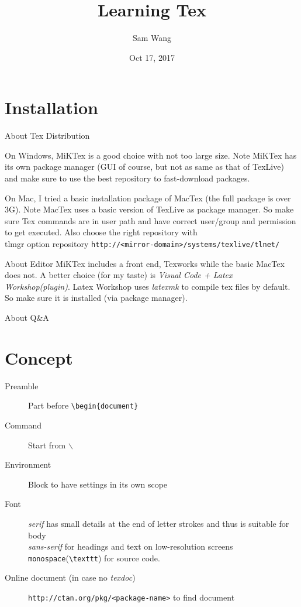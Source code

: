 \documentclass{article}
\title{Learning Tex}
\author{Sam Wang}
\date{Oct 17, 2017}
\newcommand{\site}[2][protocol]{\texttt{#1://#2}}
\begin{document}
\maketitle

\tableofcontents

\section{Installation}
About Tex Distribution

On Windows, MiKTex is a good choice with not too large size. Note MiKTex has its own package manager (GUI of course, but not as same as that of TexLive) and make sure to use the best repository to fast-download packages. 

On Mac, I tried a basic installation package of MacTex (the full package is over 3G). Note MacTex uses a basic version of TexLive as package manager. So make sure Tex commands are in user path and have correct user/group and permission to get executed. Also choose the right repository with 
\\tlmgr option repository \site[http]{<mirror-domain>/systems/texlive/tlnet/} 

About Editor
MiKTex includes a front end, Texworks\label{texworks} while the basic MacTex does not. A better choice (for my taste) is \emph{Visual Code + Latex Workshop(plugin)}. Latex Workshop uses \emph{latexmk} to compile tex files by default. So make sure it is installed (via package manager). 

About Q\&A \cite{R02}

\section{Concept}
\begin{description}
\item[Preamble]Part before \verb|\begin{document}|
\item[Command]Start from $\backslash$
\item[Environment]Block to have settings in its own scope
\item[Font]\emph{serif} has small details at the end of letter strokes and thus is suitable for body
\\ \emph{sans-serif} for headings and text on low-resolution screens
\\ \texttt{monospace}(\verb|\texttt|) for source code. 
\item[Online document (in case no \emph{texdoc})]\site[http]{ctan.org/pkg/<package-name>} to find document
\end{description}
\end{document}
